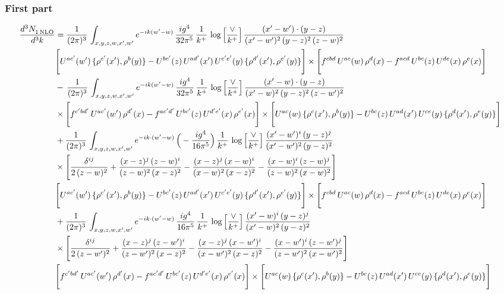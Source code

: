 \documentclass[9pt]{article}
\numberwithin{equation}{section}
\begin{document}
\subsubsection{First part}
\begin{align}
 \frac{d^{3}N_{1\,\rm NLO}^{\rm}}{d^{3}k}  & =    \frac{1}{(2\pi)^{3}}\,\int_{x,y,z,w,x',w^{\prime}} e^{-ik(w^{\prime}-w)}\, \frac{ig^{4}}{32\pi^{5}}\,\frac{1}{k^{+}}\,\log{\left[\frac{\vee}{ k^{+}}\right]}\, \frac{(x'-w')\cdot (y-z)}{(x'-w')^{2}\,(y-z)^{2}\,(z-w)^{2}}\notag \\ &  \Bigg[U^{ac'}(w')\,\{\rho^{c'}(x'),\rho^{b}(y)\}-U^{bc'}(z)\,U^{ad'}(x')\,U^{c'e'}(y)\, \{\rho^{d'}(x'),\rho^{e'}(y)\}\Bigg]\times \Bigg[f^{cbd}\,U^{ac}(w)\,\rho^{d}(x)-f^{acd}\, U^{bc}(z)\,U^{de}(x)\,\rho^{e}(x)\Bigg]\notag \\ & -\, \frac{1}{(2\pi)^{3}}\,\int_{x,y,z,w,x',w^{\prime}} e^{-ik(w^{\prime}-w)}\,\frac{ig^{4}}{32\pi^{5}}\,\frac{1}{k^{+}}\,\log{\left[\frac{\vee}{k^{+}}\right]}\, \frac{(x'-w)\cdot (y-z)}{(x'-w)^{2}\,(y-z)^{2}\,(z-w')^{2}}\notag \\ &  \times\Bigg[f^{c'bd'}\,U^{ac'}(w')\,\rho^{d'}(x)-f^{ac'd'}\, U^{bc'}(z)\,U^{d'e'}(x)\,\rho^{e'}(x)\Bigg] \times \Bigg[U^{ac}(w)\,\{\rho^{c}(x'),\rho^{b}(y)\}-U^{bc}(z)\,U^{ad}(x')\,U^{ce}(y)\, \{\rho^{d}(x'),\rho^{e}(y)\}\Bigg]
\notag \\ & +\frac{1}{(2\pi)^{3}}\,\int_{x,y,z,w,x',w'}e^{-ik\cdot (w^\prime-w)}\,\Big(-\frac{ig^{4}}{16\pi^{5}}\Big)\,\frac{1}{k^{+}}\,\log{\left[\frac{\vee}{k^{+}}\right]}\,\frac{(x'-w')^{i}\,(y-z)^{j}}{(x'-w')^{2}\,(y-z)^{2}}\notag \\ & \times \Bigg[\frac{\delta^{ij}}{2\,(z-w)^{2}}+\frac{(x-z)^{j}\,(z-w)^{i}}{(z-w)^{2}\,(x-z)^{2}}-\frac{(x-z)^{j}\,(x-w)^{i}}{(x-w)^{2}\,(x-z)^{2}}-\frac{(x-w)^{i}\,(z-w)^{j}}{(z-w)^{2}\,(x-w)^{2}}\Bigg]\notag \\ & \Bigg[U^{ac'}(w')\,\{\rho^{c'}(x'),\rho^{b}(y)\}-U^{bc'}(z)\,U^{ad'}(x')\,U^{c'e'}(y)\, \{\rho^{d'}(x'),\rho^{e'}(y)\}\Bigg]\times \Bigg[f^{cbd}\,U^{ac}(w)\,\rho^{d}(x)-f^{acd}\, U^{bc}(z)\,U^{de}(x)\,\rho^{e}(x)\Bigg]\notag \\ & +\frac{1}{(2\pi)^{3}}\,\int_{x,y,z,w,x',w'}e^{-ik\cdot (w^\prime-w)}\,\frac{ig^{4}}{16\pi^{5}}\,\frac{1}{k^{+}}\,\log{\left[\frac{\vee}{k^{+}}\right]}\,\frac{(x'-w)^{i}\,(y-z)^{j}}{(x'-w)^{2}\,(y-z)^{2}}\notag \\ & \times \Bigg[\frac{\delta^{ij}}{2\,(z-w')^{2}}+\frac{(x-z)^{j}\,(z-w')^{i}}{(z-w')^{2}\,(x-z)^{2}}-\frac{(x-z)^{j}\,(x-w')^{i}}{(x-w')^{2}\,(x-z)^{2}}-\frac{(x-w')^{i}\,(z-w')^{j}}{(z-w')^{2}\,(x-w')^{2}}\Bigg]\notag \\ & \Bigg[f^{c'bd'}\,U^{ac'}(w')\,\rho^{d'}(x)-f^{ac'd'}\, U^{bc'}(z)\,U^{d'e'}(x)\,\rho^{e'}(x)\Bigg] \times \Bigg[U^{ac}(w)\,\{\rho^{c}(x'),\rho^{b}(y)\}-U^{bc}(z)\,U^{ad}(x')\,U^{ce}(y)\, \{\rho^{d}(x'),\rho^{e}(y)\}\Bigg]
\end{align}
\end{document}
